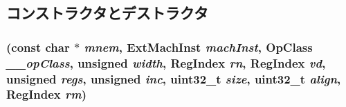 \subsection{コンストラクタとデストラクタ}
\hypertarget{classArmISA_1_1VstMultOp_a701693769a1feaeea70657430ea392b3}{
\subsubsection[{VstMultOp}]{ (const char $\ast$ {\em mnem}, \/  {\bf ExtMachInst} {\em machInst}, \/  OpClass {\em \_\-\_\-opClass}, \/  unsigned {\em width}, \/  {\bf RegIndex} {\em rn}, \/  {\bf RegIndex} {\em vd}, \/  unsigned {\em regs}, \/  unsigned {\em inc}, \/  {\bf uint32\_\-t} {\em size}, \/  {\bf uint32\_\-t} {\em align}, \/  {\bf RegIndex} {\em rm})}}
\label{classArmISA_1_1VstMultOp_a701693769a1feaeea70657430ea392b3}



